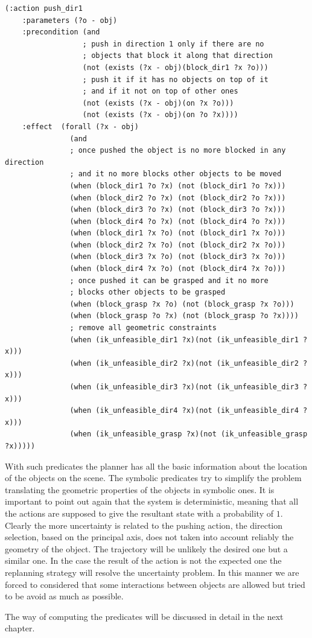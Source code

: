 \lstset{language=pddl}
\begin{lstlisting}[caption={PDDL syntax of the pushing action along direction 1},label=pushPDDL]
(:action push_dir1
    :parameters (?o - obj)
    :precondition (and
                  ; push in direction 1 only if there are no
                  ; objects that block it along that direction
                  (not (exists (?x - obj)(block_dir1 ?x ?o)))
                  ; push it if it has no objects on top of it
                  ; and if it not on top of other ones
                  (not (exists (?x - obj)(on ?x ?o)))
                  (not (exists (?x - obj)(on ?o ?x))))
    :effect  (forall (?x - obj)
               (and
               ; once pushed the object is no more blocked in any direction
               ; and it no more blocks other objects to be moved
               (when (block_dir1 ?o ?x) (not (block_dir1 ?o ?x)))
               (when (block_dir2 ?o ?x) (not (block_dir2 ?o ?x)))
               (when (block_dir3 ?o ?x) (not (block_dir3 ?o ?x)))
               (when (block_dir4 ?o ?x) (not (block_dir4 ?o ?x)))
               (when (block_dir1 ?x ?o) (not (block_dir1 ?x ?o)))
               (when (block_dir2 ?x ?o) (not (block_dir2 ?x ?o)))
               (when (block_dir3 ?x ?o) (not (block_dir3 ?x ?o)))
               (when (block_dir4 ?x ?o) (not (block_dir4 ?x ?o)))
               ; once pushed it can be grasped and it no more
               ; blocks other objects to be grasped
               (when (block_grasp ?x ?o) (not (block_grasp ?x ?o)))
               (when (block_grasp ?o ?x) (not (block_grasp ?o ?x))))
               ; remove all geometric constraints 
               (when (ik_unfeasible_dir1 ?x)(not (ik_unfeasible_dir1 ?x)))
               (when (ik_unfeasible_dir2 ?x)(not (ik_unfeasible_dir2 ?x)))
               (when (ik_unfeasible_dir3 ?x)(not (ik_unfeasible_dir3 ?x)))
               (when (ik_unfeasible_dir4 ?x)(not (ik_unfeasible_dir4 ?x)))
               (when (ik_unfeasible_grasp ?x)(not (ik_unfeasible_grasp ?x)))))
\end{lstlisting}

\mbox{}


With such predicates the planner has all the basic information about the location of the objects on the scene. The symbolic predicates try to simplify the problem translating the geometric properties of the objects in symbolic ones. It is important to point out again that the system is deterministic, meaning that all the actions are supposed to give the resultant state with a probability of $1$. Clearly the more uncertainty is related to the pushing action, the direction selection, based on the principal axis, does not taken into account reliably the geometry of the object. The trajectory will be unlikely the desired one but a similar one. In the case the result of the action is not the expected one the replanning strategy will resolve the uncertainty problem. In this manner we are forced to considered that some interactions between objects are allowed but tried to be avoid as much as possible. 

\mbox{}

The way of computing the predicates will be discussed in detail in the next chapter.



